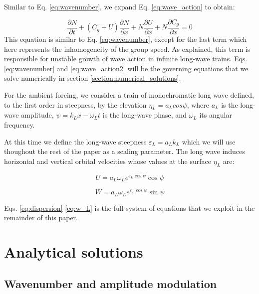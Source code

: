 \documentclass[draft]{agujournal2019}
\begin{document}
Similar to Eq. \ref{eq:wavenumber}, we expand Eq. \ref{eq:wave_action} to obtain:

\begin{equation}
\label{eq:wave_action2}
\dfrac{\partial N}{\partial t}
+ \left(C_g + U\right) \dfrac{\partial N}{\partial x}
+ N \dfrac{\partial U}{\partial x}
+ N \dfrac{\partial C_g}{\partial x}
= 0
\end{equation}
This equation is similar to Eq. \ref{eq:wavenumber}, except for the last term
which here represents the inhomogeneity of the group speed.
As  explained, this term is responsible for unstable
growth of wave action in infinite long-wave trains.
Eqs. \ref{eq:wavenumber} and \ref{eq:wave_action2} will be the governing equations
that we solve numerically in section \ref{section:numerical_solutions}.

For the ambient forcing, we consider a train of monochromatic long wave
defined, to the first order in steepness, by the elevation $\eta_L = a_L cos{\psi}$,
where $a_L$ is the long-wave amplitude, $\psi = k_L x - \omega_L t$ is the
long-wave phase, and $\omega_L$ its angular frequency.

At this time we define the long-wave steepness $\varepsilon_L = a_L k_L$ which
we will use thoughout the rest of the paper as a scaling parameter.
The long wave induces horizontal and vertical orbital velocities whose values
at the surface $\eta_L$ are:

\begin{equation}
\label{eq:U_L}
U = a_L \omega_L e^{\varepsilon_L \cos{\psi}} \cos{\psi}
\end{equation}

\begin{equation}
\label{eq:w_L}
W = a_L \omega_L e^{\varepsilon_L \cos{\psi}} \sin{\psi}
\end{equation}

Eqs. \ref{eq:dispersion}-\ref{eq:w_L} is the full system of equations that we
exploit in the remainder of this paper.

\section{Analytical solutions}
\label{section:analytical_solutions}

\subsection{Wavenumber and amplitude modulation}
\label{subsection:analytical_solutions}
\end{document}
